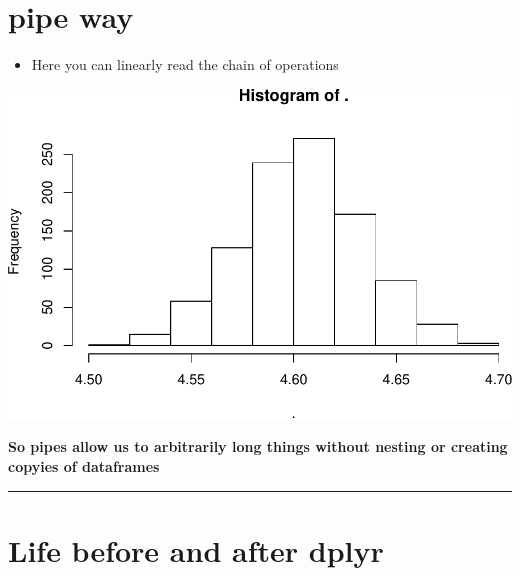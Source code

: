 \documentclass[]{article}
\newenvironment{Shaded}{\begin{snugshade}}{\end{snugshade}}
\newcommand{\CommentTok}[1]{\textcolor[rgb]{0.56,0.35,0.01}{\textit{#1}}}
\newcommand{\DataTypeTok}[1]{\textcolor[rgb]{0.13,0.29,0.53}{#1}}
\newcommand{\DecValTok}[1]{\textcolor[rgb]{0.00,0.00,0.81}{#1}}
\newcommand{\KeywordTok}[1]{\textcolor[rgb]{0.13,0.29,0.53}{\textbf{#1}}}
\newcommand{\NormalTok}[1]{#1}
\newcommand{\OperatorTok}[1]{\textcolor[rgb]{0.81,0.36,0.00}{\textbf{#1}}}
\newcommand{\StringTok}[1]{\textcolor[rgb]{0.31,0.60,0.02}{#1}}
\providecommand{\tightlist}{%
  \setlength{\itemsep}{0pt}\setlength{\parskip}{0pt}}
\begin{document}
\hypertarget{pipe-way}{%
\section{pipe way}\label{pipe-way}}

\begin{itemize}
\tightlist
\item
  Here you can linearly read the chain of operations
\end{itemize}

\begin{Shaded}
\end{Shaded}

\includegraphics{R_tidyverse_for_geographers_files/figure-latex/unnamed-chunk-3-1.pdf}

\textbf{So pipes allow us to arbitrarily long things without nesting or
creating copyies of dataframes}

\begin{center}\rule{0.5\linewidth}{\linethickness}\end{center}

\hypertarget{life-before-and-after-dplyr}{%
\section{Life before and after
dplyr}\label{life-before-and-after-dplyr}}
\end{document}
